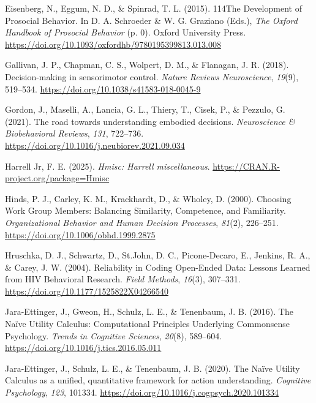 \documentclass[
  man,
  floatsintext,
  longtable,
  nolmodern,
  notxfonts,
  notimes,
  colorlinks=true,linkcolor=blue,citecolor=blue,urlcolor=blue]{apa7}
\newlength{\cslhangindent}
\newenvironment{CSLReferences}[2] %
 {\begin{list}{}{%
  \setlength{\itemindent}{0pt}
  \setlength{\leftmargin}{0pt}
  \setlength{\parsep}{0pt}
  \ifodd #1
   \setlength{\leftmargin}{\cslhangindent}
   \setlength{\itemindent}{-1\cslhangindent}
  \fi
  \setlength{\itemsep}{#2\baselineskip}}}
 {\end{list}}
\begin{document}
\begin{CSLReferences}{1}{0}
Eisenberg, N., Eggum, N. D., \& Spinrad, T. L. (2015). {114The
Development} of {Prosocial Behavior}. In D. A. Schroeder \& W. G.
Graziano (Eds.), \emph{The {Oxford Handbook} of {Prosocial Behavior}}
(p. 0). Oxford University Press.
\url{https://doi.org/10.1093/oxfordhb/9780195399813.013.008}

Gallivan, J. P., Chapman, C. S., Wolpert, D. M., \& Flanagan, J. R.
(2018). Decision-making in sensorimotor control. \emph{Nature Reviews
Neuroscience}, \emph{19}(9), 519--534.
\url{https://doi.org/10.1038/s41583-018-0045-9}

Gordon, J., Maselli, A., Lancia, G. L., Thiery, T., Cisek, P., \&
Pezzulo, G. (2021). The road towards understanding embodied decisions.
\emph{Neuroscience \& Biobehavioral Reviews}, \emph{131}, 722--736.
\url{https://doi.org/10.1016/j.neubiorev.2021.09.034}

Harrell Jr, F. E. (2025). \emph{{Hmisc}: Harrell miscellaneous}.
\url{https://CRAN.R-project.org/package=Hmisc}

Hinds, P. J., Carley, K. M., Krackhardt, D., \& Wholey, D. (2000).
Choosing {Work Group Members}: {Balancing Similarity}, {Competence}, and
{Familiarity}. \emph{Organizational Behavior and Human Decision
Processes}, \emph{81}(2), 226--251.
\url{https://doi.org/10.1006/obhd.1999.2875}

Hruschka, D. J., Schwartz, D., St.John, D. C., Picone-Decaro, E.,
Jenkins, R. A., \& Carey, J. W. (2004). Reliability in {Coding
Open-Ended Data}: {Lessons Learned} from {HIV Behavioral Research}.
\emph{Field Methods}, \emph{16}(3), 307--331.
\url{https://doi.org/10.1177/1525822X04266540}

Jara-Ettinger, J., Gweon, H., Schulz, L. E., \& Tenenbaum, J. B. (2016).
The {Na{ï}ve Utility Calculus}: {Computational Principles Underlying
Commonsense Psychology}. \emph{Trends in Cognitive Sciences},
\emph{20}(8), 589--604. \url{https://doi.org/10.1016/j.tics.2016.05.011}

Jara-Ettinger, J., Schulz, L. E., \& Tenenbaum, J. B. (2020). The
{Na{ï}ve Utility Calculus} as a unified, quantitative framework for
action understanding. \emph{Cognitive Psychology}, \emph{123}, 101334.
\url{https://doi.org/10.1016/j.cogpsych.2020.101334}


\end{CSLReferences}
\end{document}
